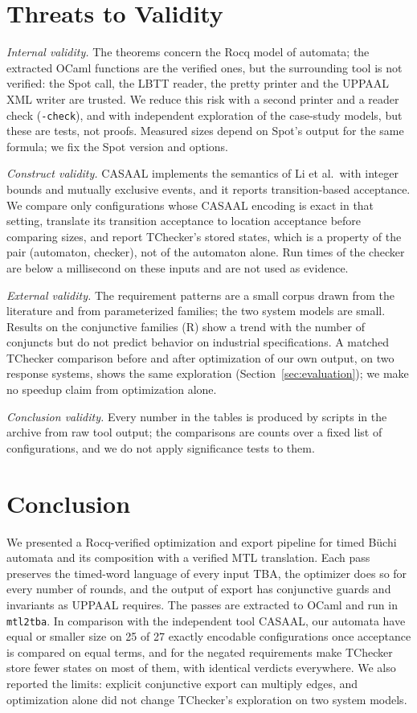 \section{Threats to Validity}
\label{sec:threats}
\emph{Internal validity.} The theorems concern the Rocq model of automata; the extracted OCaml functions are the verified ones, but the surrounding tool is not verified: the Spot call, the LBTT reader, the pretty printer and the UPPAAL XML writer are trusted. We reduce this risk with a second printer and a reader check (\texttt{-check}), and with independent exploration of the case-study models, but these are tests, not proofs. Measured sizes depend on Spot's output for the same formula; we fix the Spot version and options.

\emph{Construct validity.} CASAAL implements the semantics of Li et al.\ with integer bounds and mutually exclusive events, and it reports transition-based acceptance. We compare only configurations whose CASAAL encoding is exact in that setting, translate its transition acceptance to location acceptance before comparing sizes, and report TChecker's stored states, which is a property of the pair (automaton, checker), not of the automaton alone. Run times of the checker are below a millisecond on these inputs and are not used as evidence.

\emph{External validity.} The requirement patterns are a small corpus drawn from the literature and from parameterized families; the two system models are small. Results on the conjunctive families (R) show a trend with the number of conjuncts but do not predict behavior on industrial specifications. A matched TChecker comparison before and after optimization of our own output, on two response systems, shows the same exploration (Section~\ref{sec:evaluation}); we make no speedup claim from optimization alone.

\emph{Conclusion validity.} Every number in the tables is produced by scripts in the archive from raw tool output; the comparisons are counts over a fixed list of configurations, and we do not apply significance tests to them.

\section{Conclusion}
\label{sec:conclusion}
We presented a Rocq-verified optimization and export pipeline for timed B\"uchi automata and its composition with a verified MTL translation. Each pass preserves the timed-word language of every input TBA, the optimizer does so for every number of rounds, and the output of export has conjunctive guards and invariants as UPPAAL requires. The passes are extracted to OCaml and run in \texttt{mtl2tba}. In comparison with the independent tool CASAAL, our automata have equal or smaller size on 25 of 27 exactly encodable configurations once acceptance is compared on equal terms, and for the negated requirements make TChecker store fewer states on most of them, with identical verdicts everywhere. We also reported the limits: explicit conjunctive export can multiply edges, and optimization alone did not change TChecker's exploration on two system models.

